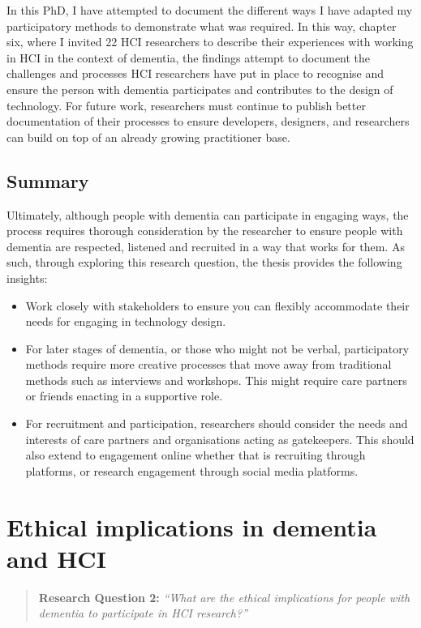 In this PhD, I have attempted to document the different ways I have adapted my participatory methods to demonstrate what was required. In this way, chapter six, where I invited 22 HCI researchers to describe their experiences with working in HCI in the context of dementia, the findings attempt to document the challenges and processes HCI researchers have put in place to recognise and ensure the person with dementia participates and contributes to the design of technology. For future work, researchers must continue to publish better documentation of their processes to ensure developers, designers, and researchers can build on top of an already growing practitioner base.

\subsection{Summary}
\label{RQ1:Summary}
Ultimately, although people with dementia can participate in engaging ways, the process requires thorough consideration by the researcher to ensure people with dementia are respected, listened and recruited in a way that works for them. As such, through exploring this research question, the thesis provides the following insights:

\begin{itemize}
    \item Work closely with stakeholders to ensure you can flexibly accommodate their needs for engaging in technology design.
    \item For later stages of dementia, or those who might not be verbal, participatory methods require more creative processes that move away from traditional methods such as interviews and workshops. This might require care partners or friends enacting in a supportive role.
    \item For recruitment and participation, researchers should consider the needs and interests of care partners and organisations acting as gatekeepers. This should also extend to engagement online whether that is recruiting through platforms, or research engagement through social media platforms. 
\end{itemize}

\section{Ethical implications in dementia and HCI}
\label{Discussion:RQ2}
\begin{quote}
\textbf{    Research Question 2:
}    
\textit{    “What are the ethical implications for people with dementia to participate in HCI research?”}
\end{quote}

